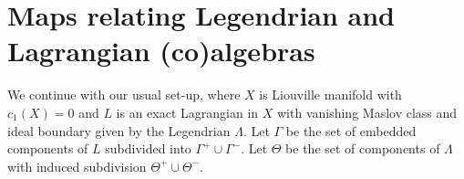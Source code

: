 \documentclass{gtpart}
\begin{document}



\section{Maps relating Legendrian and Lagrangian (co)algebras}\label{Sec:LegLag}
We continue with our usual set-up, where $X$ is Liouville manifold with $c_1(X)=0$ and $L$ is an
exact Lagrangian in $X$ with vanishing Maslov class and ideal boundary given by the Legendrian
$\Lambda$. Let $\Gamma$ be the set of embedded components of $L$ subdivided into
$\Gamma^{+}\cup\Gamma^{-}$. Let $\Theta$ be the set of components of $\Lambda$ with induced
subdivision $\Theta^{+}\cup\Theta^{-}$. 
\end{document}

